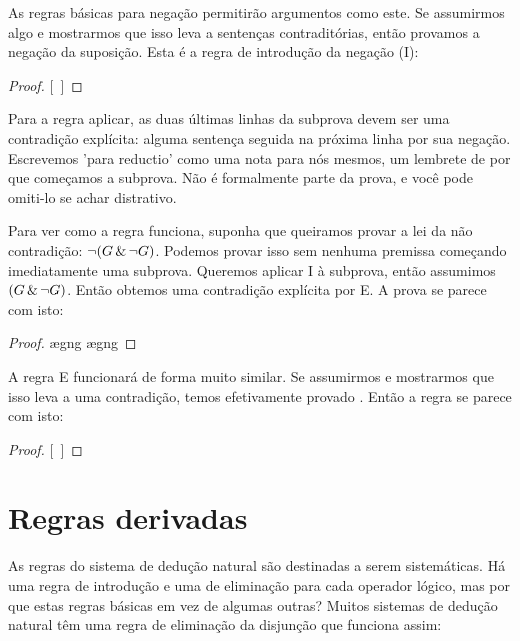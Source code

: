 As regras básicas para negação permitirão argumentos como este. Se assumirmos algo e mostrarmos que isso leva a sentenças contraditórias, então provamos a negação da suposição. Esta é a regra de introdução da negação ({\enot}I):

\begin{proof}
\open
\close
{}[\ ]{\enot{}}
\end{proof}

Para a regra aplicar, as duas últimas linhas da subprova devem ser uma contradição explícita: alguma sentença seguida na próxima linha por sua negação. Escrevemos 'para reductio' como uma nota para nós mesmos, um lembrete de por que começamos a subprova. Não é formalmente parte da prova, e você pode omiti-lo se achar distrativo.

Para ver como a regra funciona, suponha que queiramos provar a lei da não contradição: $\neg(G \,\&\, \neg G)$. Podemos provar isso sem nenhuma premissa começando imediatamente uma subprova. Queremos aplicar {\enot}I à subprova, então assumimos $(G\,\&\, \neg G)$. Então obtemos uma contradição explícita por {\eand}E. A prova se parece com isto:

\begin{proof}
	\open
		\ae{gng}
		\ae{gng}
	\close
\end{proof}

A regra {\enot}E funcionará de forma muito similar. Se assumirmos \enot{} e mostrarmos que isso leva a uma contradição, temos efetivamente provado . Então a regra se parece com isto:

\begin{proof}
\open
\close
{}[\ ]{}
\end{proof}


\section{Regras derivadas}
As regras do sistema de dedução natural são destinadas a serem sistemáticas. Há uma regra de introdução e uma de eliminação para cada operador lógico, mas por que estas regras básicas em vez de algumas outras? Muitos sistemas de dedução natural têm uma regra de eliminação da disjunção que funciona assim:

